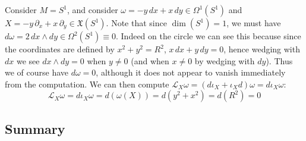 \begin{example}
	Consider $M = S^1$, and consider $\omega = -y\,dx + x\,dy\in\Omega^1(S^1)$ and $X = -y\,\partial_x + x\,\partial_y\in
	\mathfrak X(S^1)$. Note that since $\dim(S^1) = 1$, we must have $d\omega = 2\,dx\wedge dy\in\Omega^2(S^1) \equiv
	0$. Indeed on the circle we can see this because since the coordinates are defined by $x^2 + y^2 = R^2$, $x\,dx + 
	y\,dy = 0$, hence wedging with $dx$ we see $dx\wedge dy = 0$ when $y\neq 0$ (and when $x\neq 0$ by wedging with 
	$dy$). Thus we of course have $d\omega = 0$, although it does not appear to vanish immediately from the computation. 
	We can then compute $\mathcal L_X\omega = (d\iota_X + \iota_X d)\omega = d\iota_X\omega$:
	\begin{equation}
		\mathcal L_X\omega = d\iota_X\omega = d(\omega(X)) = d(y^2 + x^2) = d(R^2) = 0
	\end{equation}
	
\end{example}

\newpage
\subsection{Summary}

